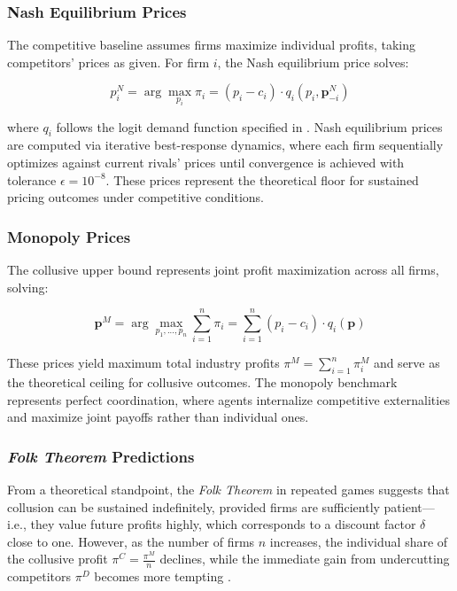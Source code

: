 \subsubsection*{Nash Equilibrium Prices}

The competitive baseline assumes firms maximize individual profits, taking competitors' prices as given. For firm $i$, the Nash equilibrium price solves:

\begin{equation}\label{eq:nash}
    p_i^{N} = \arg\max_{p_i} \pi_i = (p_i - c_i) \cdot q_i(p_i, \mathbf{p}_{-i}^N)
\end{equation}

where $q_i$ follows the logit demand function specified in . Nash equilibrium prices are computed via iterative best-response dynamics, where each firm sequentially optimizes against current rivals' prices until convergence is achieved with tolerance $\epsilon = 10^{-8}$. These prices represent the theoretical floor for sustained pricing outcomes under competitive conditions.

\subsubsection*{Monopoly Prices}

The collusive upper bound represents joint profit maximization across all firms, solving:

\begin{equation}\label{eq:monop}
    \mathbf{p}^M = \arg\max_{p_1,...,p_n} \sum_{i=1}^n \pi_i = \sum_{i=1}^n (p_i - c_i) \cdot q_i(\mathbf{p})
\end{equation}

These prices yield maximum total industry profits $\pi^M = \sum_{i=1}^n \pi_i^M$ and serve as the theoretical ceiling for collusive outcomes. The monopoly benchmark represents perfect coordination, where agents internalize competitive externalities and maximize joint payoffs rather than individual ones.

    \subsubsection*{\emph{Folk Theorem} Predictions}

From a theoretical standpoint, the \emph{Folk Theorem} in repeated games suggests that collusion can be sustained indefinitely, provided firms are sufficiently patient---i.e., they value future profits highly, which corresponds to a discount factor $\delta$ close to one. However, as the number of firms $n$ increases, the individual share of the collusive profit $\pi^C = \frac{\pi^M}{n}$ declines, while the immediate gain from undercutting competitors $\pi^D$ becomes more tempting \parencite{ivaldi_chapter_2007, tirole_theory_1988}.

